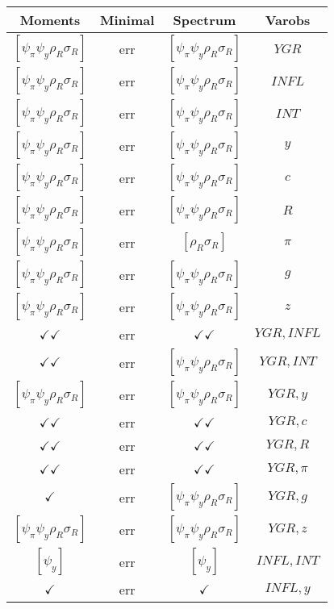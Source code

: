 \documentclass[a4paper,10pt]{article}
\begin{document}
\centering
\begin{longtable}{|c|c|c|c|}
\hline
Moments & Minimal & Spectrum & Varobs \\
\hline
$[\psi_\pi \psi_y \rho_R \sigma_R ]$ & err & $[\psi_\pi \psi_y \rho_R \sigma_R ]$ & ${YGR}$ \\
\hline
$[\psi_\pi \psi_y \rho_R \sigma_R ]$ & err & $[\psi_\pi \psi_y \rho_R \sigma_R ]$ & ${INFL}$ \\
\hline
$[\psi_\pi \psi_y \rho_R \sigma_R ]$ & err & $[\psi_\pi \psi_y \rho_R \sigma_R ]$ & ${INT}$ \\
\hline
$[\psi_\pi \psi_y \rho_R \sigma_R ]$ & err & $[\psi_\pi \psi_y \rho_R \sigma_R ]$ & ${y}$ \\
\hline
$[\psi_\pi \psi_y \rho_R \sigma_R ]$ & err & $[\psi_\pi \psi_y \rho_R \sigma_R ]$ & ${c}$ \\
\hline
$[\psi_\pi \psi_y \rho_R \sigma_R ]$ & err & $[\psi_\pi \psi_y \rho_R \sigma_R ]$ & ${R}$ \\
\hline
$[\psi_\pi \psi_y \rho_R \sigma_R ]$ & err & $[\rho_R \sigma_R ]$ & ${\pi}$ \\
\hline
$[\psi_\pi \psi_y \rho_R \sigma_R ]$ & err & $[\psi_\pi \psi_y \rho_R \sigma_R ]$ & ${g}$ \\
\hline
$[\psi_\pi \psi_y \rho_R \sigma_R ]$ & err & $[\psi_\pi \psi_y \rho_R \sigma_R ]$ & ${z}$ \\
\hline
$\checkmark\checkmark$ & err & $\checkmark\checkmark$ & ${YGR},{INFL}$ \\
\hline
$\checkmark\checkmark$ & err & $[\psi_\pi \psi_y \rho_R \sigma_R ]$ & ${YGR},{INT}$ \\
\hline
$[\psi_\pi \psi_y \rho_R \sigma_R ]$ & err & $[\psi_\pi \psi_y \rho_R \sigma_R ]$ & ${YGR},{y}$ \\
\hline
$\checkmark\checkmark$ & err & $\checkmark\checkmark$ & ${YGR},{c}$ \\
\hline
$\checkmark\checkmark$ & err & $\checkmark\checkmark$ & ${YGR},{R}$ \\
\hline
$\checkmark\checkmark$ & err & $\checkmark\checkmark$ & ${YGR},{\pi}$ \\
\hline
$\checkmark$ & err & $[\psi_\pi \psi_y \rho_R \sigma_R ]$ & ${YGR},{g}$ \\
\hline
$[\psi_\pi \psi_y \rho_R \sigma_R ]$ & err & $[\psi_\pi \psi_y \rho_R \sigma_R ]$ & ${YGR},{z}$ \\
\hline
$[\psi_y ]$ & err & $[\psi_y ]$ & ${INFL},{INT}$ \\
\hline
$\checkmark$ & err & $\checkmark$ & ${INFL},{y}$ \\

\end{longtable}
\end{document}
